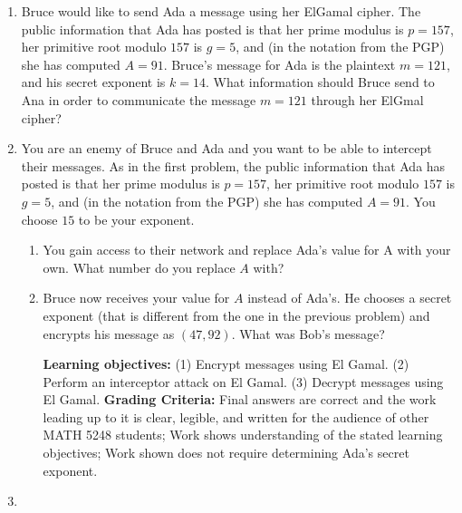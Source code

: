 \documentclass[12pt]{article}
\begin{document}
\begin{enumerate}


 \item Bruce would like to send Ada a message using her ElGamal cipher.  The public information that Ada has posted is that her prime modulus is $p = 157$, her primitive root modulo $157$ is $g = 5$, and (in the notation from the PGP) she has computed $A = 91$.    Bruce's message for Ada is the plaintext $m = 121$, and his secret exponent is $k = 14$.  What information should Bruce send to Ana in order to communicate the message $m = 121$ through her ElGmal cipher?  
 
 \item  You are an enemy of Bruce and Ada and you want to be able to intercept their messages. As in the first problem,  the public information that Ada has posted is that her prime modulus is $p = 157$, her primitive root modulo $157$ is $g = 5$, and (in the notation from the PGP) she has computed $A = 91$.  You choose $15$ to be your exponent. 
\begin{enumerate}
\item You gain access to their network and replace Ada's value for A with your own. What number do you replace $A$ with?
\item Bruce now receives your value for $A$ instead of Ada's. He chooses a secret exponent (that is different from the one in the previous problem) and encrypts his message as $(47,92)$. What was Bob's message?

{\bf Learning objectives:} (1) Encrypt messages using El Gamal. (2) Perform an interceptor attack on El Gamal.  (3) Decrypt messages using El Gamal.
{\bf Grading Criteria:} Final answers are correct and the work leading up to it is clear, legible, and written for the audience of other MATH 5248 students; Work shows understanding of the stated learning objectives; Work shown does not require determining Ada's secret exponent.
\end{enumerate} 
  

 
 
 \item \begin{enumerate}
 

\end{enumerate}
\end{enumerate}
\end{document}
